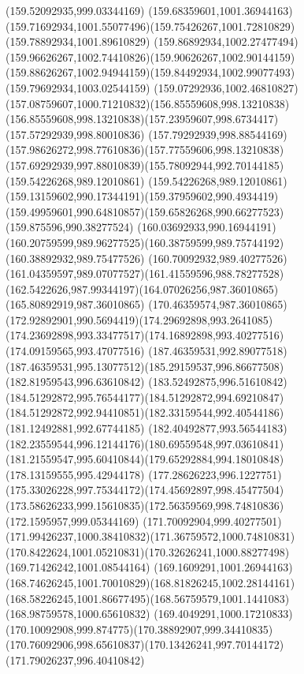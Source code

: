 {{		\lineto(159.52092935,999.03344169)
		\lineto(159.68359601,1001.36944163)
		\curveto(159.71692934,1001.55077496)(159.75426267,1001.72810829)(159.78892934,1001.89610829)
		\curveto(159.86892934,1002.27477494)(159.96626267,1002.74410826)(159.90626267,1002.90144159)
		\curveto(159.88626267,1002.94944159)(159.84492934,1002.99077493)(159.79692934,1003.02544159)
		\curveto(159.07292936,1002.46810827)(157.08759607,1000.71210832)(156.85559608,998.13210838)
		\curveto(156.85559608,998.13210838)(157.23959607,998.6734417)(157.57292939,998.80010836)
		\curveto(157.79292939,998.88544169)(157.98626272,998.77610836)(157.77559606,998.13210838)
		\curveto(157.69292939,997.88010839)(155.78092944,992.70144185)(159.54226268,989.12010861)
		\curveto(159.54226268,989.12010861)(159.13159602,990.17344191)(159.37959602,990.4934419)
		\curveto(159.49959601,990.64810857)(159.65826268,990.66277523)(159.875596,990.38277524)
		\curveto(160.03692933,990.16944191)(160.20759599,989.96277525)(160.38759599,989.75744192)
		\lineto(160.38892932,989.75477526)
		\curveto(160.70092932,989.40277526)(161.04359597,989.07077527)(161.41559596,988.78277528)
		\curveto(162.5422626,987.99344197)(164.07026256,987.36010865)(165.80892919,987.36010865)
		\curveto(170.46359574,987.36010865)(172.92892901,990.5694419)(174.29692898,993.2641085)
		\curveto(174.23692898,993.33477517)(174.16892898,993.40277516)(174.09159565,993.47077516)
		\moveto(187.46359531,992.89077518)
		\curveto(187.46359531,995.13077512)(185.29159537,996.86677508)(182.81959543,996.63610842)
		\curveto(183.52492875,996.51610842)(184.51292872,995.76544177)(184.51292872,994.69210847)
		\curveto(184.51292872,992.94410851)(182.33159544,992.40544186)(181.12492881,992.67744185)
		\curveto(182.40492877,993.56544183)(182.23559544,996.12144176)(180.69559548,997.03610841)
		\curveto(181.21559547,995.60410844)(179.65292884,994.18010848)(178.13159555,995.42944178)
		\curveto(177.28626223,996.1227751)(175.33026228,997.75344172)(174.45692897,998.45477504)
		\curveto(173.58626233,999.15610835)(172.56359569,998.74810836)(172.1595957,999.05344169)
		\curveto(171.70092904,999.40277501)(171.99426237,1000.38410832)(171.36759572,1000.74810831)
		\curveto(170.8422624,1001.05210831)(170.32626241,1000.88277498)(169.71426242,1001.08544164)
		\curveto(169.1609291,1001.26944163)(168.74626245,1001.70010829)(168.81826245,1002.28144161)
		\curveto(168.58226245,1001.86677495)(168.56759579,1001.1441083)(168.98759578,1000.65610832)
		\curveto(169.4049291,1000.17210833)(170.10092908,999.874775)(170.38892907,999.34410835)
		\curveto(170.76092906,998.65610837)(170.13426241,997.70144172)(171.79026237,996.40410842)
}}
